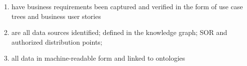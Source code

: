 \begin{enumerate}

  \item have business requirements been captured and verified in the form of use case trees and business user stories
  \item are all data sources identified; defined in the knowledge graph; SOR and authorized distribution points;
  \item all data in machine-readable form and linked to ontologies

\end{enumerate}

